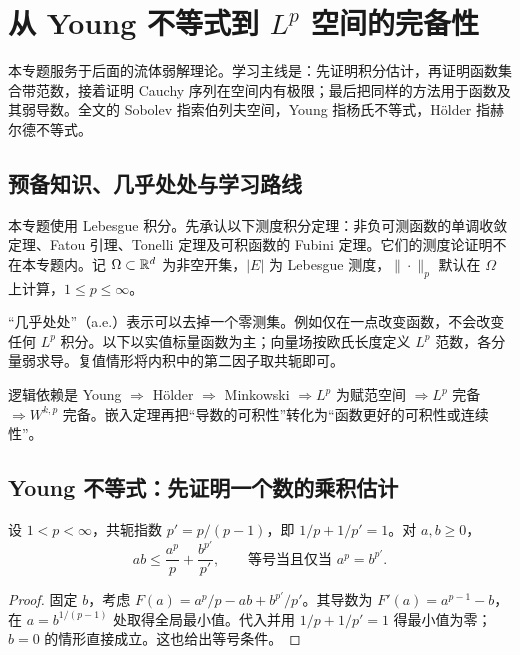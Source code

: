 \section{从 Young 不等式到 \texorpdfstring{$L^p$}{Lp} 空间的完备性}\label{sec:lp-foundations}

本专题服务于后面的流体弱解理论。学习主线是：先证明积分估计，再证明函数集合带范数，接着证明 Cauchy 序列在空间内有极限；最后把同样的方法用于函数及其弱导数。全文的 Sobolev 指索伯列夫空间，Young 指杨氏不等式，H\"older 指赫尔德不等式。

\subsection{预备知识、几乎处处与学习路线}

本专题使用 Lebesgue 积分。先承认以下测度积分定理：非负可测函数的单调收敛定理、Fatou 引理、Tonelli 定理及可积函数的 Fubini 定理。它们的测度论证明不在本专题内。记 $\Omega\subset\mathbb R^d$ 为非空开集，$|E|$ 为 Lebesgue 测度，$\|\cdot\|_p$ 默认在 $\Omega$ 上计算，$1\le p\le\infty$。

“几乎处处”（a.e.）表示可以去掉一个零测集。例如仅在一点改变函数，不会改变任何 $L^p$ 积分。以下以实值标量函数为主；向量场按欧氏长度定义 $L^p$ 范数，各分量弱求导。复值情形将内积中的第二因子取共轭即可。

\begin{keypoint}
逻辑依赖是 Young $\Rightarrow$ H\"older $\Rightarrow$ Minkowski $\Rightarrow L^p$ 为赋范空间 $\Rightarrow L^p$ 完备 $\Rightarrow W^{k,p}$ 完备。嵌入定理再把“导数的可积性”转化为“函数更好的可积性或连续性”。
\end{keypoint}

\subsection{Young 不等式：先证明一个数的乘积估计}

\begin{theorem}\label{thm:lp-young}
设 $1<p<\infty$，共轭指数 $p'=p/(p-1)$，即 $1/p+1/p'=1$。对 $a,b\ge0$，
\begin{equation}
 ab\le\frac{a^p}{p}+\frac{b^{p'}}{p'},
 \qquad\text{等号当且仅当 }a^p=b^{p'}.
 \label{eq:lp-young}
\end{equation}
\end{theorem}
\begin{proof}
固定 $b$，考虑 $F(a)=a^p/p-ab+b^{p'}/p'$。其导数为 $F'(a)=a^{p-1}-b$，在 $a=b^{1/(p-1)}$ 处取得全局最小值。代入并用 $1/p+1/p'=1$ 得最小值为零；$b=0$ 的情形直接成立。这也给出等号条件。
\end{proof}

